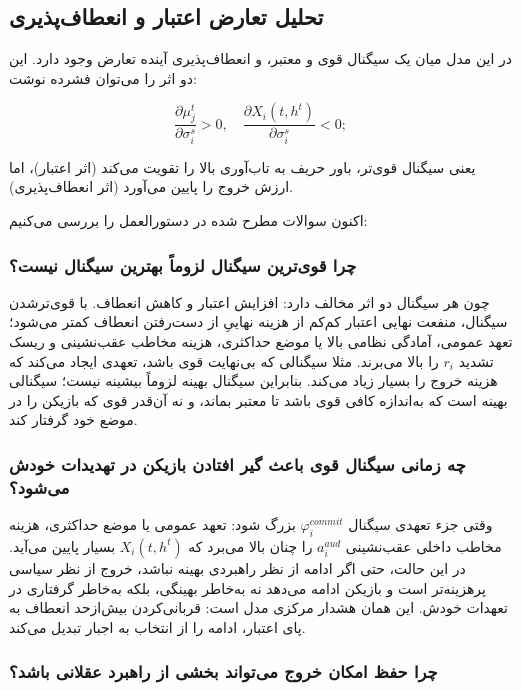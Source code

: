 \documentclass[12pt]{article}
\begin{document}
\subsection{تحلیل تعارض اعتبار و انعطاف‌پذیری}

در این مدل میان یک سیگنال قوی و معتبر، و انعطاف‌پذیری آینده
تعارض وجود دارد.
 این دو اثر را می‌توان فشرده نوشت:

\begin{equation*}
    \frac{\partial \mu_j^t}{\partial \sigma_i^s} > 0,
    \quad
    \frac{\partial X_i(t,h^t)}{\partial \sigma_i^s} < 0;
\end{equation*}

یعنی سیگنال قوی‌تر، باور حریف به تاب‌آوری بالا را تقویت می‌کند (اثر اعتبار)،
اما ارزش خروج را پایین می‌آورد (اثر انعطاف‌پذیری).

اکنون سوالات مطرح شده در دستورالعمل را بررسی می‌کنیم:

\subsubsection*{چرا قوی‌ترین سیگنال لزوماً بهترین سیگنال نیست؟}

چون هر سیگنال دو اثر مخالف دارد: افزایش اعتبار و کاهش انعطاف.
با قوی‌ترشدن سیگنال، منفعت نهایی اعتبار
 کم‌کم از هزینه نهاییِ از دست‌رفتن انعطاف کمتر می‌شود؛
تعهد عمومی، آمادگی نظامی بالا یا موضع حداکثری،
هزینه مخاطب عقب‌نشینی و ریسک تشدید $r_i$
 را بالا می‌برند.
 مثلا سیگنالی که بی‌نهایت قوی باشد، تعهدی ایجاد می‌کند که هزینه خروج را 
 بسیار زیاد می‌کند.
بنابراین سیگنال بهینه لزوماً بیشینه نیست؛
سیگنالی بهینه است که به‌اندازه کافی قوی باشد تا معتبر بماند،
و نه آن‌قدر قوی که بازیکن را در موضع خود گرفتار کند.

\subsubsection*{چه زمانی سیگنال قوی باعث گیر افتادن بازیکن در تهدیدات خودش می‌شود؟}

وقتی جزء تعهدی سیگنال $\varphi_i^{commit}$
 بزرگ شود:
تعهد عمومی یا موضع حداکثری، هزینه مخاطب داخلی عقب‌نشینی $a_i^{aud}$
 را
چنان بالا می‌برد که $X_i(t,h^t)$ بسیار پایین می‌آید.
در این حالت، حتی اگر ادامه از نظر راهبردی بهینه نباشد،
خروج از نظر سیاسی پرهزینه‌تر است و بازیکن ادامه می‌دهد 
نه به‌خاطر بهینگی، بلکه به‌خاطر گرفتاری در تعهدات خودش.
این همان هشدار مرکزی مدل است:
قربانی‌کردن بیش‌ازحد انعطاف به پای اعتبار، ادامه را از انتخاب به اجبار تبدیل می‌کند.

\subsubsection*{چرا حفظ امکان خروج می‌تواند بخشی از راهبرد عقلانی باشد؟}
\end{document}
